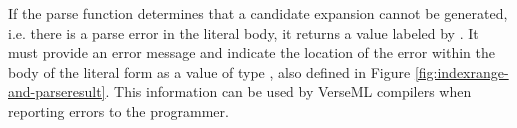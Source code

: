 If the parse function determines that a candidate expansion cannot be generated, i.e. there is a parse error in the literal body, it returns a value labeled by . It must provide an error message and indicate the location of the error within the body of the literal form as a value of type , also defined in Figure \ref{fig:indexrange-and-parseresult}. This information can be used by VerseML compilers when reporting errors to the programmer.



